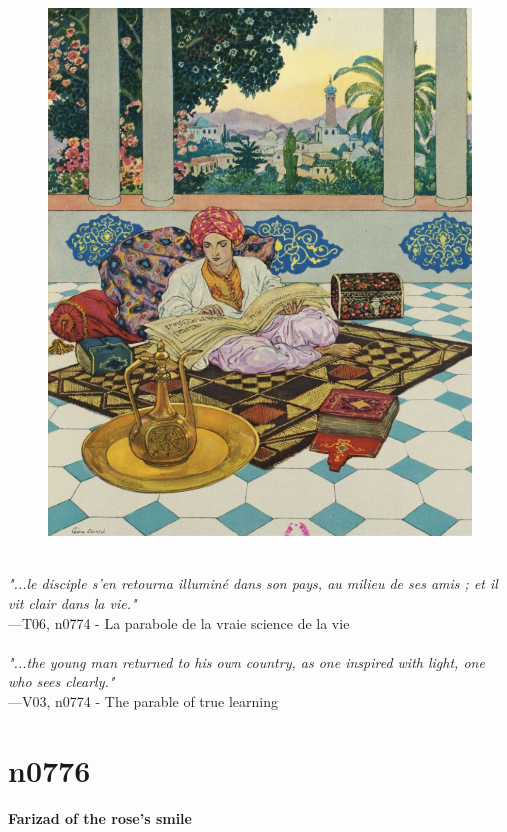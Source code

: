 \documentclass[../Carre_nights.tex]{subfiles}
\begin{document}
\begin{figure}[ht]
\centering
\includegraphics[height=\figsize]{illustrations/volume_6/T06, n0774 - La parabole de la vraie science de la vie.jpg}
\end{figure}

\textit{\\
"...le disciple s’en retourna illuminé dans son pays, au milieu de ses amis ; et il vit clair dans la vie."} \\
—T06, n0774 - La parabole de la vraie science de la vie \\~\\
\textit{"...the young man returned to his own country, as one inspired with light, one who sees clearly."} \\
—V03, n0774 - The parable of true learning

\newpage

\section{n0776}
\textbf{\Large{Farizad of the rose’s smile}} \\
\end{document}
